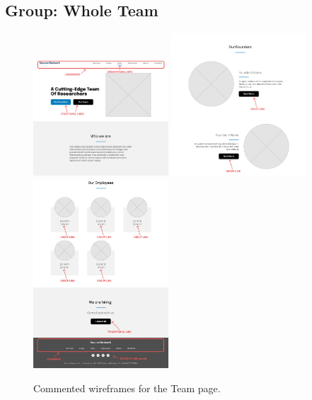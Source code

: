 \documentclass[12pt]{report}
\begin{document}
\subsection{Group: Whole Team}

\begin{figure}[H]
	\centering
	\includegraphics[width=0.45\textwidth]{low_fid_wireframes/team/1.png}
	\includegraphics[width=0.45\textwidth]{low_fid_wireframes/team/2.png}
	\includegraphics[width=0.45\textwidth]{low_fid_wireframes/team/3.png}
	\caption{Commented wireframes for the Team page.}
\end{figure}
\end{document}
